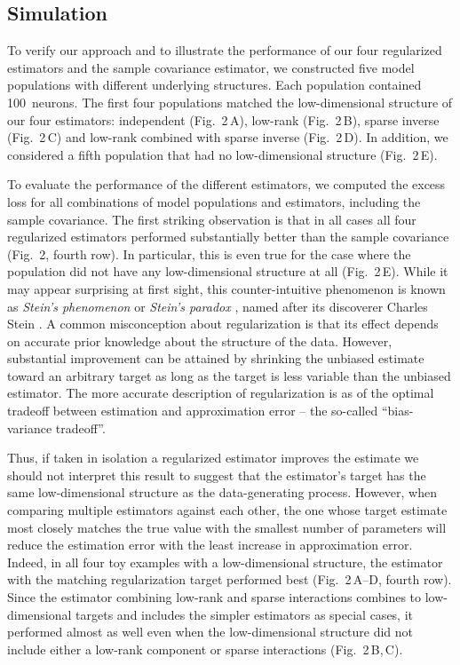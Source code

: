 \subsection*{Simulation}

To verify our approach and to illustrate the performance of our four regularized estimators and the sample covariance estimator, we constructed five model populations with different underlying structures. Each population contained 100~neurons. The first four populations matched the low-dimensional structure of our four estimators: independent (Fig.~2\,A), low-rank (Fig.~2\,B), sparse inverse (Fig.~2\,C) and low-rank combined with sparse inverse (Fig.~2\,D).  In addition, we considered a fifth population that had no low-dimensional structure (Fig.~2\,E).

To evaluate the performance of the different estimators, we computed the excess loss for all combinations of model populations and estimators, including the sample covariance. The first striking observation is that in all cases all four regularized estimators performed substantially better than the sample covariance (Fig.~2, fourth row). In particular, this is even true for the case where the population did not have any low-dimensional structure at all (Fig.~2\,E). While it may appear surprising at first sight, this counter-intuitive phenomenon is known as \emph{Stein's phenomenon} or \emph{Stein's paradox} \cite{Efron:1977}, named after its discoverer Charles Stein \cite{Stein:1956}. A common misconception about regularization is that its effect depends on accurate prior knowledge about the structure of the data. However, substantial improvement can be attained by shrinking the unbiased estimate toward an arbitrary target as long as the target is less variable than the unbiased estimator. The more accurate description of regularization is as of the optimal tradeoff between estimation and approximation error -- the so-called ``bias-variance tradeoff''.

Thus, if taken in isolation a regularized estimator improves the estimate we should not interpret this result to suggest that the estimator's target has the same low-dimensional structure as the data-generating process. However, when comparing multiple estimators against each other, the one whose target estimate most closely matches the true value with the smallest number of parameters will reduce the estimation error with the least increase in approximation error. Indeed, in all four toy examples with a low-dimensional structure, the estimator with the matching regularization target performed best (Fig.~2\,A--D, fourth row). Since the estimator combining low-rank and sparse interactions combines to low-dimensional targets and includes the simpler estimators as special cases, it performed almost as well even when the low-dimensional structure did not include either a low-rank component or sparse interactions (Fig.~2\,B,\,C).  

